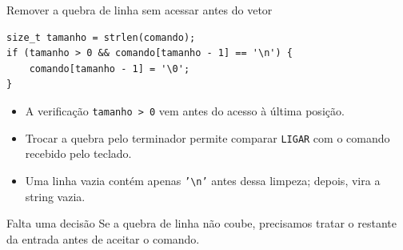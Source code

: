 \begin{frame}[fragile]{Remover a quebra de linha sem acessar antes do vetor}
\begin{lstlisting}
size_t tamanho = strlen(comando);
if (tamanho > 0 && comando[tamanho - 1] == '\n') {
    comando[tamanho - 1] = '\0';
}
\end{lstlisting}
\begin{itemize}
\item A verificação \texttt{tamanho > 0} vem antes do acesso à última posição.
\item Trocar a quebra pelo terminador permite comparar \texttt{LIGAR} com o comando recebido pelo teclado.
\item Uma linha vazia contém apenas \texttt{'\textbackslash n'} antes dessa limpeza; depois, vira a string vazia.
\end{itemize}
\begin{block}{Falta uma decisão}
Se a quebra de linha não coube, precisamos tratar o restante da entrada antes de aceitar o comando.
\end{block}
\end{frame}
